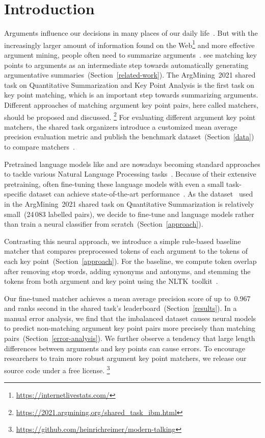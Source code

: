 \section{Introduction}\label{introduction}

Arguments influence our decisions in many places of our daily life~\cite{Bar-HaimEFKLS2020}.
But with the increasingly larger amount of information found on the Web\footnote{\url{https://internetlivestats.com/}} 
and more effective argument mining, people often need to summarize arguments~\cite{LawrenceR2019,Bar-HaimEFKLS2020}.
\citet{Bar-HaimEFKLS2020} see matching key points to arguments as an intermediate step towards automatically generating 
argumentative summaries~(Section~\ref{related-work}).
The ArgMining~2021 shared task on Quantitative Summarization and Key Point Analysis is the first task on key point matching, 
which is an important step towards summarizing arguments.
Different approaches of matching argument key point pairs, here called matchers, should be proposed and discussed.%
\footnote{\url{https://2021.argmining.org/shared_task_ibm.html}}
For evaluating different argument key point matchers, the shared task organizers introduce a customized mean average 
precision evaluation metric and publish the \ArgKP benchmark dataset~(Section~\ref{data}) to compare 
matchers~\cite{Bar-HaimEFKLS2020}. %

Pretrained language models like \Bert and \Roberta are nowadays becoming standard approaches to tackle various Natural 
Language Processing tasks~\cite{DevlinCLT2019,LiuOGDJCLLZS2019}.
Because of their extensive pretraining, often fine-tuning these language models with even a small task-specific dataset 
can achieve state-of-the-art performance~\cite{DevlinCLT2019}.
As the \ArgKP dataset~\cite{Bar-HaimEFKLS2020} used in the ArgMining~2021 shared task on Quantitative Summarization is 
relatively small~(24\,083 labelled pairs), we decide to fine-tune \Bert and \Roberta language models rather than train 
a neural classifier from scratch~(Section~\ref{approach}).

Contrasting this neural approach, we introduce a simple rule-based baseline matcher that compares preprocessed tokens of 
each argument to the tokens of each key point~(Section~\ref{approach}).
For the baseline, we compute token overlap after removing stop words, adding synonyms and antonyms, and stemming the 
tokens from both argument and key point using the NLTK~toolkit~\cite{BirdL2004}.

Our fine-tuned \RobertaBase matcher achieves a mean average precision score of up to~0.967 and ranks second in the 
shared task's leaderboard~(Section~\ref{results}).
In a manual error analysis, we find that the imbalanced \ArgKP dataset causes neural models to predict non-matching 
argument key point pairs more precisely than matching pairs~(Section~\ref{error-analysis}).
We further observe a tendency that large length differences between arguments and key points can cause errors.
To encourage researchers to train more robust argument key point matchers, we release our source code under a free license.%
\footnote{\url{https://github.com/heinrichreimer/modern-talking}}